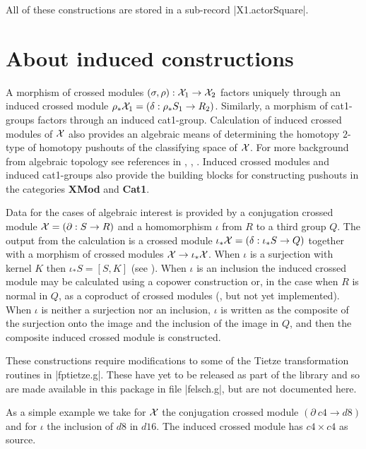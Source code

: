 All of these constructions are stored in a sub-record |X1.actorSquare|.


\section{About induced constructions}%

A morphism of crossed modules
$(\sigma, \rho) \: {\cal X}_1 \to {\cal X}_2$
factors uniquely through an induced crossed module
$\rho_{\ast} {\cal X}_1 = (\delta \: \rho_{\ast} S_1 \to R_2)$.
Similarly, a morphism of cat1-groups factors through an induced cat1-group.
Calculation of induced crossed modules of ${\cal X}$ also
provides an algebraic means of determining the homotopy $2$-type
of homotopy pushouts of the classifying space of ${\cal X}$.
For more background from algebraic topology see references in
\cite{BH1}, \cite{BW1}, \cite{BW2}.
Induced crossed modules and induced cat1-groups also provide the
building blocks for constructing pushouts in the categories
\textbf{XMod} and \textbf{Cat1}.

Data for the cases of algebraic interest is provided by a conjugation
crossed module  ${\cal X} = (\partial \: S \to R)$
and a homomorphism  $\iota$  from  $R$  to a third group  $Q$.
The output from the calculation is a crossed module
$\iota_{\ast}{\cal X} = (\delta \: \iota_{\ast}S \to Q)$
together with a morphism of crossed modules
${\cal X} \to \iota_{\ast}{\cal X}$.
When $\iota$ is a surjection with kernel $K$ then
$\iota_{\ast}S = [S,K]$ (see \cite{BH1}).
When $\iota$ is an inclusion the induced crossed module may be
calculated using a copower construction \cite{BW1} or,
in the case when $R$ is normal in $Q$, as a coproduct of crossed modules 
(\cite{BW2}, but not yet implemented).
When $\iota$ is neither a surjection nor an inclusion, $\iota$
is written as the composite of the surjection onto the image
and the inclusion of the image in $Q$, and then the composite induced
crossed module is constructed.

These constructions require modifications to some of the Tietze 
transformation routines in |fptietze.g|.
These have yet to be released as part of the {\GAP} library
and so are made available in this package in file |felsch.g|,
but are not documented here.

As a simple example we take for ${\cal X}$ the conjugation crossed
module $(\partial \: c4 \to d8)$ and for $\iota$ the inclusion of
$d8$ in $d16$.  The induced crossed module has $c4 \times c4$
as source.

